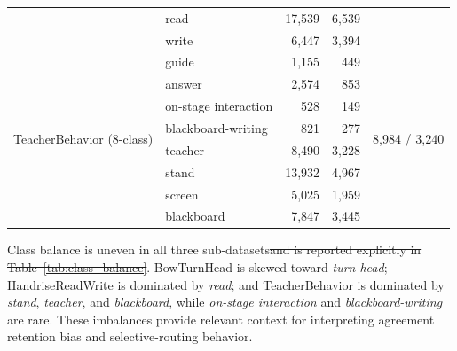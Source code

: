 \documentclass{ieeeaccess}
\providecommand{\DIFdel}[1]{{\protect\color{red}\sout{#1}}}                      %
\providecommand{\DIFdelbegin}{} %
\providecommand{\DIFdelend}{} %
\providecommand{\DIFaddendFL}{} %
\newcommand{\DIFscaledelfig}{0.5}
\newlength{\DIFdelgraphicswidth} %
\newlength{\DIFdelgraphicsheight} %
\newcommand{\DIFdelincludegraphics}[2][]{%
\sbox{\DIFdelgraphicsbox}{\DIFOincludegraphics[#1]{#2}}%
\settoboxwidth{\DIFdelgraphicswidth}{\DIFdelgraphicsbox} %
\settoboxtotalheight{\DIFdelgraphicsheight}{\DIFdelgraphicsbox} %
\scalebox{\DIFscaledelfig}{%
\parbox[b]{\DIFdelgraphicswidth}{\usebox{\DIFdelgraphicsbox}\\[-\baselineskip] \rule{\DIFdelgraphicswidth}{0em}}\llap{\resizebox{\DIFdelgraphicswidth}{\DIFdelgraphicsheight}{%
\setlength{\unitlength}{\DIFdelgraphicswidth}%
\begin{picture}(1,1)%
\thicklines\linethickness{2pt} %
{\color[rgb]{1,0,0}\put(0,0){\framebox(1,1){}}}%
{\color[rgb]{1,0,0}\put(0,0){\line( 1,1){1}}}%
{\color[rgb]{1,0,0}\put(0,1){\line(1,-1){1}}}%
\end{picture}%
}\hspace*{3pt}}} %
} %
\DeclareRobustCommand{\DIFdelbegin}{\DIFOdelbegin \let\includegraphics\DIFdelincludegraphics} %
\DeclareRobustCommand{\DIFdelend}{\DIFOaddend \let\includegraphics\DIFOincludegraphics} %
\DeclareRobustCommand{\DIFaddendFL}{\DIFOaddendFL \let\includegraphics\DIFOincludegraphics} %
\begin{document}
\begin{table}[!ht]
{\begin{tabular}{llrrr}
 & read & 17{,}539 & 6{,}539 & \\
 & write & 6{,}447 & 3{,}394 & \\
\midrule
\multirow{8}{*}{TeacherBehavior (8-class)} & guide & 1{,}155 & 449 & \multirow{8}{*}{8{,}984 / 3{,}240} \\
 & answer & 2{,}574 & 853 & \\
 & on-stage interaction & 528 & 149 & \\
 & blackboard-writing & 821 & 277 & \\
 & teacher & 8{,}490 & 3{,}228 & \\
 & stand & 13{,}932 & 4{,}967 & \\
 & screen & 5{,}025 & 1{,}959 & \\
 & blackboard & 7{,}847 & 3{,}445 & \\
\bottomrule
\end{tabular}
}
\DIFaddendFL \end{table}

Class balance is uneven in all three sub-datasets\DIFdelbegin \DIFdel{and is reported
explicitly in Table~\ref{tab:class_balance}}\DIFdelend .
BowTurnHead is skewed toward \textit{turn-head}; HandriseReadWrite is
dominated by \textit{read}; and TeacherBehavior is dominated by
\textit{stand}, \textit{teacher}, and \textit{blackboard}, while
\textit{on-stage interaction} and \textit{blackboard-writing} are rare.
These imbalances provide relevant context for interpreting agreement
retention bias and selective-routing behavior.
\end{document}
